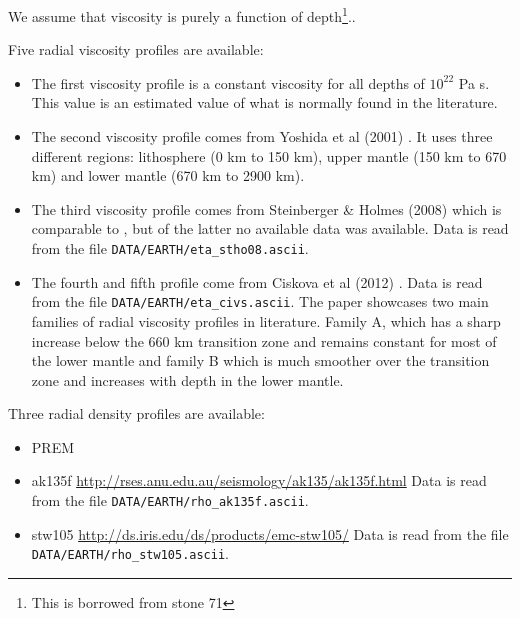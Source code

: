 
We assume that viscosity is purely a function of depth\footnote{This is borrowed
from stone 71}.. 

Five radial viscosity profiles are available:
\begin{itemize}
\item The first viscosity profile is a constant viscosity for all depths of $10^{22}$ Pa s.
This value is an estimated value of what is normally found in the literature. 

\item The second viscosity profile comes from Yoshida et al (2001) \cite{yohk01}. It uses three different regions: lithosphere (0 km to 150 km), upper mantle (150 km to 670 km) and lower mantle (670 km to 2900 km).

\item The third viscosity profile comes from Steinberger \& Holmes (2008) \cite{stho08}
which is comparable to \cite{stca06}, but of the latter no available data was available.
Data is read from the file \texttt{DATA/EARTH/eta\_stho08.ascii}.

\item The fourth and fifth profile come from Ciskova et al (2012) \cite{civs12}.
Data is read from the file \texttt{DATA/EARTH/eta\_civs.ascii}.
The paper showcases two main families of radial viscosity profiles in literature. Family A, which has a sharp
increase below the 660 km transition zone and remains constant for most of the lower mantle
and family B which is much smoother over the transition zone and increases with depth in the lower mantle.

\end{itemize}

Three radial density profiles are available:

\begin{itemize}
\item PREM \cite{dzan81}
\item ak135f \cite{keeb95} \url{http://rses.anu.edu.au/seismology/ak135/ak135f.html}
Data is read from the file \texttt{DATA/EARTH/rho\_ak135f.ascii}.
\item stw105 \cite{kued08} \url{http://ds.iris.edu/ds/products/emc-stw105/}
Data is read from the file \texttt{DATA/EARTH/rho\_stw105.ascii}.
\end{itemize}

